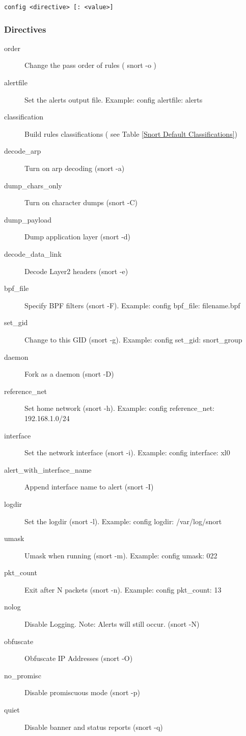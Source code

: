 \documentclass[english]{report}
\begin{document}
\begin{verbatim}
config <directive> [: <value>]
\end{verbatim}

\subsubsection{Directives}

\begin{description}
\item [order]Change the pass order of rules ( snort -o )
\item [alertfile]Set the alerts output file. Example: config alertfile:
alerts 
\item [classification]Build rules classifications ( see Table \ref{Snort Default Classifications})
\item [decode\_arp]Turn on arp decoding (snort -a) 
\item [dump\_chars\_only]Turn on character dumps (snort -C)
\item [dump\_payload]Dump application layer (snort -d)
\item [decode\_data\_link]Decode Layer2 headers (snort -e)
\item [bpf\_file]Specify BPF filters (snort -F). Example: config bpf\_file:
filename.bpf
\item [set\_gid]Change to this GID (snort -g). Example: config set\_gid:
snort\_group
\item [daemon]Fork as a daemon (snort -D) 
\item [reference\_net]Set home network (snort -h). Example: config reference\_net:
192.168.1.0/24
\item [interface]Set the network interface (snort -i). Example: config
interface: xl0
\item [alert\_with\_interface\_name]Append interface name to alert (snort
-I) 
\item [logdir]Set the logdir (snort -l). Example: config logdir: /var/log/snort
\item [umask]Umask when running (snort -m). Example: config umask: 022
\item [pkt\_count]Exit after N packets (snort -n). Example: config pkt\_count:
13
\item [nolog]Disable Logging. Note: Alerts will still occur. (snort -N)
\item [obfuscate]Obfuscate IP Addresses (snort -O)
\item [no\_promisc]Disable promiscuous mode (snort -p)
\item [quiet]Disable banner and status reports (snort -q)

\end{description}
\end{document}
